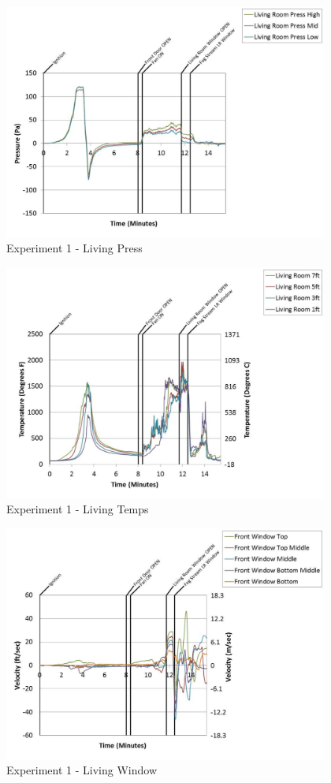 \documentclass{article}
\begin{document}
\begin{appendices}
	\begin{figure}[h!]
		\centering
		\includegraphics[height=3.05in]{0_Images/Results_Charts/Exp_1_Charts/LivingPress.pdf}
		\caption{Experiment 1 - Living Press}
	\end{figure}
 
	\clearpage

	\begin{figure}[h!]
		\centering
		\includegraphics[height=3.05in]{0_Images/Results_Charts/Exp_1_Charts/LivingTemps.pdf}
		\caption{Experiment 1 - Living Temps}
	\end{figure}
 

	\begin{figure}[h!]
		\centering
		\includegraphics[height=3.05in]{0_Images/Results_Charts/Exp_1_Charts/LivingWindow.pdf}
		\caption{Experiment 1 - Living Window}
	\end{figure}
 

\end{appendices}
\end{document}
